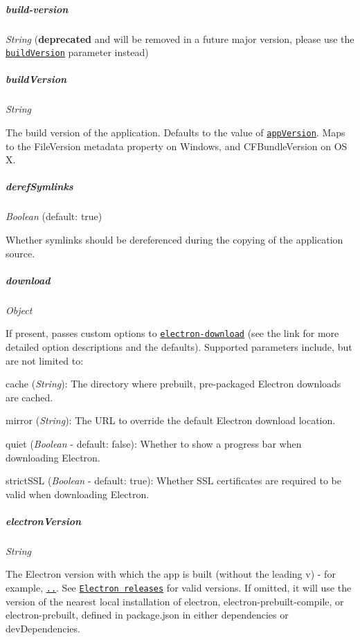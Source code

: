 \subparagraph*{{\ttfamily build-\/version}}

{\itshape String} ({\bfseries deprecated} and will be removed in a future major version, please use the \href{#buildversion}{\tt {\ttfamily build\+Version}} parameter instead)

\subparagraph*{{\ttfamily build\+Version}}

{\itshape String}

The build version of the application. Defaults to the value of \href{#appversion}{\tt {\ttfamily app\+Version}}. Maps to the {\ttfamily File\+Version} metadata property on Windows, and {\ttfamily C\+F\+Bundle\+Version} on OS X.

\subparagraph*{{\ttfamily deref\+Symlinks}}

{\itshape Boolean} (default\+: {\ttfamily true})

Whether symlinks should be dereferenced during the copying of the application source.

\subparagraph*{{\ttfamily download}}

{\itshape Object}

If present, passes custom options to \href{https://www.npmjs.com/package/electron-download}{\tt {\ttfamily electron-\/download}} (see the link for more detailed option descriptions and the defaults). Supported parameters include, but are not limited to\+:
\begin{DoxyItemize}
\item {\ttfamily cache} ({\itshape String})\+: The directory where prebuilt, pre-\/packaged Electron downloads are cached.
\item {\ttfamily mirror} ({\itshape String})\+: The U\+RL to override the default Electron download location.
\item {\ttfamily quiet} ({\itshape Boolean} -\/ default\+: {\ttfamily false})\+: Whether to show a progress bar when downloading Electron.
\item {\ttfamily strict\+S\+SL} ({\itshape Boolean} -\/ default\+: {\ttfamily true})\+: Whether S\+SL certificates are required to be valid when downloading Electron.
\end{DoxyItemize}

\subparagraph*{{\ttfamily electron\+Version}}

{\itshape String}

The Electron version with which the app is built (without the leading \textquotesingle{}v\textquotesingle{}) -\/ for example, \href{https://github.com/electron/electron/releases/tag/v1.4.13}{\tt {..}}. See \href{https://github.com/electron/electron/releases}{\tt Electron releases} for valid versions. If omitted, it will use the version of the nearest local installation of {\ttfamily electron}, {\ttfamily electron-\/prebuilt-\/compile}, or {\ttfamily electron-\/prebuilt}, defined in {\ttfamily package.\+json} in either {\ttfamily dependencies} or {\ttfamily dev\+Dependencies}.

